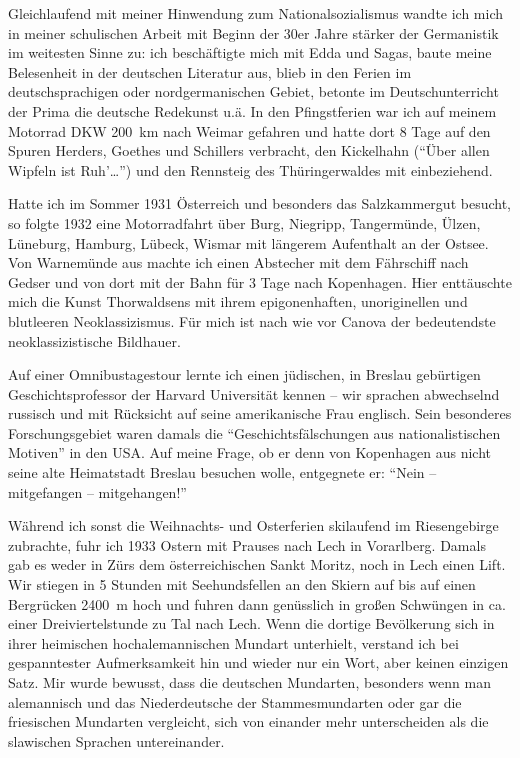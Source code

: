 \documentclass[a5paper,pagesize,10pt,twoside=true]{scrbook}
\begin{document}
Gleichlaufend mit meiner Hinwendung zum Nationalsozialismus wandte ich mich in meiner schulischen Arbeit mit Beginn der 30er Jahre stärker der Germanistik im weitesten Sinne zu: ich beschäftigte mich mit Edda und Sagas, baute meine Belesenheit in der deutschen Literatur aus, blieb in den Ferien im deutschsprachigen oder nordgermanischen Gebiet, betonte im Deutschunterricht der Prima die deutsche Redekunst u.ä. In den Pfingstferien war ich auf meinem Motorrad DKW 200~km nach Weimar gefahren und hatte dort 8 Tage auf den Spuren Herders, Goethes und Schillers verbracht, den Kickelhahn (\enquote{Über allen Wipfeln ist Ruh'\dots}) und den Rennsteig des Thüringerwaldes mit einbeziehend.

Hatte ich im Sommer 1931 Österreich und besonders das Salzkammergut besucht, so folgte 1932 eine Motorradfahrt über Burg, Niegripp, Tangermünde, Ülzen, Lüneburg, Hamburg, Lübeck, Wismar mit längerem Aufenthalt an der Ostsee. Von Warnemünde aus machte ich einen Abstecher mit dem Fährschiff nach Gedser und von dort mit der Bahn für 3 Tage nach Kopenhagen. Hier enttäuschte mich die Kunst Thorwaldsens mit ihrem epigonenhaften, unoriginellen und blutleeren Neoklassizismus. Für mich ist nach wie vor Canova der bedeutendste neoklassizistische Bildhauer.

Auf einer Omnibustagestour lernte ich einen jüdischen, in Breslau gebürtigen Geschichtsprofessor der Harvard Universität kennen -- wir sprachen abwechselnd russisch und mit Rücksicht auf seine amerikanische Frau englisch. Sein besonderes Forschungsgebiet waren damals die \enquote{Geschichtsfälschungen aus nationalistischen Motiven} in den USA. Auf meine Frage, ob er denn von Kopenhagen aus nicht seine alte Heimatstadt Breslau besuchen wolle, entgegnete er: \enquote{Nein -- mitgefangen -- mitgehangen!}

Während ich sonst die Weihnachts- und Osterferien skilaufend im Riesengebirge zubrachte, fuhr ich 1933 Ostern mit Prauses nach Lech in Vorarlberg. Damals gab es weder in Zürs dem österreichischen Sankt Moritz, noch in Lech einen Lift. Wir stiegen in 5 Stunden mit Seehundsfellen an den Skiern auf bis auf einen Bergrücken 2400~m hoch und fuhren dann genüsslich in großen Schwüngen in ca. einer Dreiviertelstunde zu Tal nach Lech. Wenn die dortige Bevölkerung sich in ihrer heimischen hochalemannischen Mundart unterhielt, verstand ich bei gespanntester Aufmerksamkeit hin und wieder nur ein Wort, aber keinen einzigen Satz. Mir wurde bewusst, dass die deutschen Mundarten, besonders wenn man alemannisch und das Niederdeutsche der Stammesmundarten oder gar die friesischen Mundarten vergleicht, sich von einander mehr unterscheiden als die slawischen Sprachen untereinander.
\end{document}
